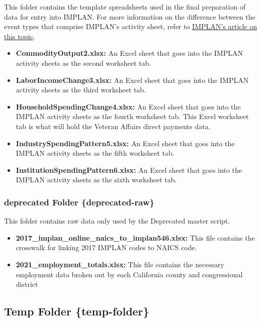 \documentclass[
]{book}
\providecommand{\tightlist}{%
  \setlength{\itemsep}{0pt}\setlength{\parskip}{0pt}}
\begin{document}
This folder contains the template spreadsheets used in the final preparation of data for entry into IMPLAN. For more information on the difference between the event types that comprise IMPLAN's activity sheet, refer to \href{https://support.implan.com/hc/en-us/articles/360019638713-Explaining-Event-Types}{IMPLAN's article on this topic}.

\begin{itemize}
\tightlist
\item
  \textbf{CommodityOutput2.xlsx:} An Excel sheet that goes into the IMPLAN activity sheets as the second worksheet tab.
\item
  \textbf{LaborIncomeChange3.xlsx:} An Excel sheet that goes into the IMPLAN activity sheets as the third worksheet tab.
\item
  \textbf{HouseholdSpendingChange4.xlsx:} An Excel sheet that goes into the IMPLAN activity sheets as the fourth worksheet tab. This Excel worksheet tab is what will hold the Veteran Affairs direct payments data.
\item
  \textbf{IndustrySpendingPattern5.xlsx:} An Excel sheet that goes into the IMPLAN activity sheets as the fifth worksheet tab.
\item
  \textbf{InstitutionSpendingPattern6.xlsx:} An Excel sheet that goes into the IMPLAN activity sheets as the sixth worksheet tab.
\end{itemize}

\hypertarget{deprecated-folder-deprecated-raw}{%
\subsubsection{deprecated Folder \{deprecated-raw\}}\label{deprecated-folder-deprecated-raw}}

This folder contains raw data only used by the Deprecated master script.

\begin{itemize}
\tightlist
\item
  \textbf{2017\_implan\_online\_naics\_to\_implan546.xlsx:} This file contains the crosswalk for linking 2017 IMPLAN codes to NAICS code.
\item
  \textbf{2021\_employment\_totals.xlsx:} This file contains the necessary employment data broken out by each California county and congressional district
\end{itemize}

\hypertarget{temp-folder-temp-folder}{%
\subsection{Temp Folder \{temp-folder\}}\label{temp-folder-temp-folder}}
\end{document}
